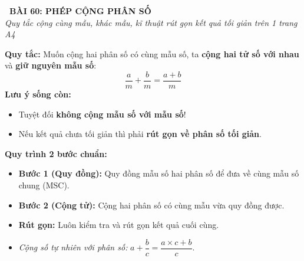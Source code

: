 \documentclass[14pt,a4paper,oneside]{extbook}
\begin{document}
\noindent
\begin{tcolorbox}[
  enhanced,
  colback=teal!8!white,
  colframe=teal!80!black,
  arc=3mm, boxrule=1pt,
  left=3mm, right=3mm, top=2mm, bottom=2mm,
  halign=center
]
  {\Large\bfseries\color{teal!90!black}\faBookmark\ BÀI 60: PHÉP CỘNG PHÂN SỐ}\\[1.5pt]
  {\footnotesize\itshape\color{black!75} Quy tắc cộng cùng mẫu, khác mẫu, kĩ thuật rút gọn kết quả tối giản trên 1 trang A4}
\end{tcolorbox}

\vspace{-2.5mm}

\noindent
\begin{minipage}[t]{0.49\textwidth}\vspace{0pt}
\begin{tcolorbox}[
  enhanced,
  colback=blue!4!white,
  colframe=blue!75!black,
  arc=2mm, boxrule=0.8pt,
  left=2mm, right=2mm, top=1.8mm, bottom=1.8mm,
  title={\footnotesize\bfseries\color{white}\faPlusCircle\ 1. Cộng hai phân số cùng mẫu}
]
{\footnotesize
\textbf{Quy tắc:} Muốn cộng hai phân số có cùng mẫu số, ta \textbf{cộng hai tử số với nhau} và \textbf{giữ nguyên mẫu số}:
$$\dfrac{a}{m} + \dfrac{b}{m} = \dfrac{a + b}{m}$$
\textbf{Lưu ý sống còn:}
\begin{itemize}\setlength{\itemsep}{1pt}\setlength{\leftskip}{-2.5mm}
  \item Tuyệt đối \textbf{không cộng mẫu số với mẫu số}!
  \item Nếu kết quả chưa tối giản thì phải \textbf{rút gọn về phân số tối giản}.
\end{itemize}
}
\end{tcolorbox}
\end{minipage}
\hfill
\begin{minipage}[t]{0.49\textwidth}\vspace{0pt}
\begin{tcolorbox}[
  enhanced,
  colback=teal!4!white,
  colframe=teal!75!black,
  arc=2mm, boxrule=0.8pt,
  left=2mm, right=2mm, top=1.8mm, bottom=1.8mm,
  title={\footnotesize\bfseries\color{white}\faRandom\ 2. Cộng hai phân số khác mẫu}
]
{\footnotesize
\textbf{Quy trình 2 bước chuẩn:}
\begin{itemize}\setlength{\itemsep}{1.5pt}\setlength{\leftskip}{-2.5mm}
  \item \textbf{Bước 1 (Quy đồng):} Quy đồng mẫu số hai phân số để đưa về cùng mẫu số chung (MSC).
  \item \textbf{Bước 2 (Cộng tử):} Cộng hai phân số có cùng mẫu vừa quy đồng được.
  \item \textbf{Rút gọn:} Luôn kiểm tra và rút gọn kết quả cuối cùng.
  \item \textit{Cộng số tự nhiên với phân số:} $a + \dfrac{b}{c} = \dfrac{a \times c + b}{c}$.
\end{itemize}
}
\end{tcolorbox}
\end{minipage}
\end{document}
